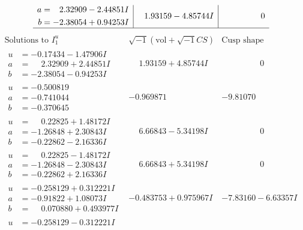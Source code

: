 \documentclass[1p]{elsarticle_modified}
\theoremstyle{definition}
\newcommand{\I}{\sqrt{-1}}
\begin{document}
$$\begin{array}{c|c|c}
\begin{aligned}
a &= \phantom{-}2.32909 - 2.44851 I \\
b &= -2.38054 + 0.94253 I\end{aligned}
 & \phantom{-}1.93159 - 4.85744 I & \phantom{-0.000000 } 0\\
 \hline 
 \end{array}$$\newpage$$\begin{array}{c|c|c}  
\text{Solutions to }I^u_{1}& \I (\text{vol} + \sqrt{-1}CS) & \text{Cusp shape}\\
 \hline 
\begin{aligned}
u &= -0.17434 - 1.47906 I \\
a &= \phantom{-}2.32909 + 2.44851 I \\
b &= -2.38054 - 0.94253 I\end{aligned}
 & \phantom{-}1.93159 + 4.85744 I & \phantom{-0.000000 } 0 \\ \hline\begin{aligned}
u &= -0.500819\phantom{ +0.000000I} \\
a &= -0.741044\phantom{ +0.000000I} \\
b &= -0.370645\phantom{ +0.000000I}\end{aligned}
 & -0.969871\phantom{ +0.000000I} & -9.81070\phantom{ +0.000000I} \\ \hline\begin{aligned}
u &= \phantom{-}0.22825 + 1.48172 I \\
a &= -1.26848 + 2.30843 I \\
b &= -0.22862 - 2.16336 I\end{aligned}
 & \phantom{-}6.66843 - 5.34198 I & \phantom{-0.000000 } 0 \\ \hline\begin{aligned}
u &= \phantom{-}0.22825 - 1.48172 I \\
a &= -1.26848 - 2.30843 I \\
b &= -0.22862 + 2.16336 I\end{aligned}
 & \phantom{-}6.66843 + 5.34198 I & \phantom{-0.000000 } 0 \\ \hline\begin{aligned}
u &= -0.258129 + 0.312221 I \\
a &= -0.91822 + 1.08073 I \\
b &= \phantom{-}0.070880 + 0.493977 I\end{aligned}
 & -0.483753 + 0.975967 I & -7.83160 - 6.63357 I \\ \hline\begin{aligned}
u &= -0.258129 - 0.312221 I \\

\end{aligned}
\end{array}$$
\end{document}
